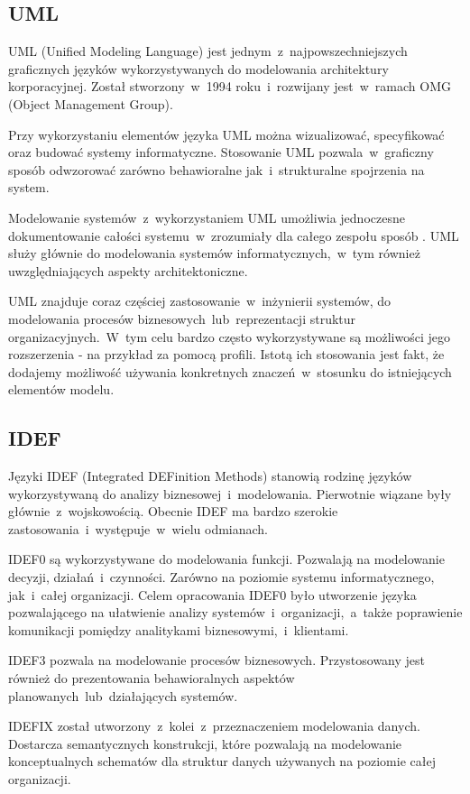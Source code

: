\subsection{UML}
UML (Unified Modeling Language) jest jednym~z~najpowszechniejszych graficznych języków wykorzystywanych do modelowania architektury korporacyjnej. Został stworzony~w~1994 roku~i~rozwijany jest~w~ramach OMG (Object Management Group). 

Przy wykorzystaniu elementów języka UML można wizualizować, specyfikować oraz budować systemy informatyczne. Stosowanie UML pozwala~w~graficzny sposób odwzorować zarówno behawioralne jak~i~strukturalne spojrzenia na system.

Modelowanie systemów~z~wykorzystaniem UML umożliwia jednoczesne dokumentowanie całości systemu~w~zrozumiały dla całego zespołu sposób \cite{PlatIntGor}. UML służy głównie do modelowania systemów informatycznych,~w~tym również uwzględniających aspekty architektoniczne. 

UML znajduje coraz częściej zastosowanie~w~inżynierii systemów, do  modelowania procesów biznesowych~lub~reprezentacji struktur organizacyjnych.~W~tym celu bardzo często wykorzystywane są możliwości jego rozszerzenia - na przykład za pomocą profili. Istotą ich stosowania jest fakt, że dodajemy możliwość używania konkretnych znaczeń~w~stosunku do istniejących elementów modelu.


\subsection{IDEF}
Języki IDEF (Integrated DEFinition Methods) stanowią rodzinę języków wykorzystywaną do analizy biznesowej~i~modelowania. Pierwotnie wiązane były głównie~z~wojskowością.  Obecnie IDEF ma bardzo szerokie zastosowania~i~występuje~w~wielu odmianach.

IDEF0 są wykorzystywane do modelowania funkcji. Pozwalają na modelowanie decyzji, działań~i~czynności. Zarówno na poziomie systemu informatycznego, jak~i~całej organizacji. Celem opracowania IDEF0 było utworzenie języka pozwalającego na ułatwienie analizy systemów~i~organizacji,~a~także poprawienie komunikacji pomiędzy analitykami biznesowymi,~i~klientami. 

IDEF3 pozwala na modelowanie procesów biznesowych. Przystosowany jest również do prezentowania behawioralnych aspektów planowanych~lub~działających systemów. 

IDEFIX został utworzony~z~kolei~z~przeznaczeniem modelowania danych. Dostarcza semantycznych konstrukcji, które pozwalają na modelowanie konceptualnych schematów dla struktur danych używanych na poziomie całej organizacji.

